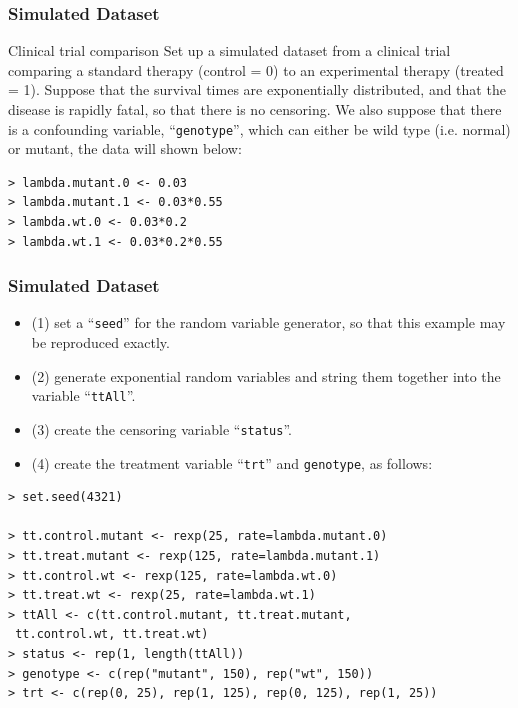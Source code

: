 \documentclass{beamer}
\begin{document}
\pagebreak
\begin{frame}[fragile]
\frametitle{Simulated Dataset}
\begin{problock}{Clinical trial comparison}
Set up {\color{red}a simulated dataset} from a clinical trial comparing a standard therapy ({\color{red}control = 0}) to an experimental therapy ({\color{red}treated = 1}). Suppose that the survival times are {\color{red}exponentially distributed}, and that the disease is rapidly fatal, so that there is {\color{red}no censoring}. We also suppose that there is a {\color{red}confounding variable}, ``\texttt{genotype}'', which can either be {\color{red}wild type} (i.e. normal) or {\color{red}mutant}, the data will shown below:
\end{problock}
\begin{Verbatim}
> lambda.mutant.0 <- 0.03
> lambda.mutant.1 <- 0.03*0.55
> lambda.wt.0 <- 0.03*0.2
> lambda.wt.1 <- 0.03*0.2*0.55
\end{Verbatim}
\end{frame}

\pagebreak
\begin{frame}[fragile]
\frametitle{Simulated Dataset}
\begin{itemize}
\item (1) set a ``\texttt{seed}'' for the random variable generator, so that this example may be reproduced exactly.
\item (2) generate exponential random variables and string them together into the variable ``\texttt{ttAll}''.
\item (3) create the censoring variable ``\texttt{status}''.
\item (4) create the treatment variable ``\texttt{trt}'' and \texttt{genotype}, as follows:
\end{itemize}
\begin{Verbatim}
> set.seed(4321)

> tt.control.mutant <- rexp(25, rate=lambda.mutant.0)
> tt.treat.mutant <- rexp(125, rate=lambda.mutant.1)
> tt.control.wt <- rexp(125, rate=lambda.wt.0)
> tt.treat.wt <- rexp(25, rate=lambda.wt.1)
> ttAll <- c(tt.control.mutant, tt.treat.mutant,
 tt.control.wt, tt.treat.wt)
> status <- rep(1, length(ttAll))
> genotype <- c(rep("mutant", 150), rep("wt", 150))
> trt <- c(rep(0, 25), rep(1, 125), rep(0, 125), rep(1, 25))
\end{Verbatim}
\end{frame}
\end{document}
